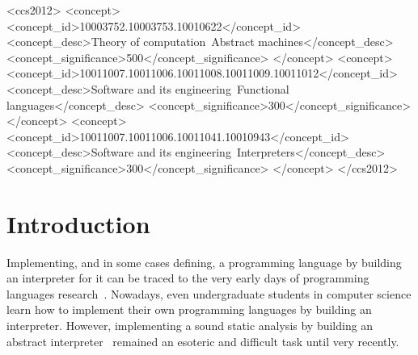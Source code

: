 \documentclass[acmsmall, screen]{acmart}\settopmatter{}
\begin{document}
\begin{CCSXML}
<ccs2012>
<concept>
<concept_id>10003752.10003753.10010622</concept_id>
<concept_desc>Theory of computation~Abstract machines</concept_desc>
<concept_significance>500</concept_significance>
</concept>
<concept>
<concept_id>10011007.10011006.10011008.10011009.10011012</concept_id>
<concept_desc>Software and its engineering~Functional languages</concept_desc>
<concept_significance>300</concept_significance>
</concept>
<concept>
<concept_id>10011007.10011006.10011041.10010943</concept_id>
<concept_desc>Software and its engineering~Interpreters</concept_desc>
<concept_significance>300</concept_significance>
</concept>
</ccs2012>
\end{CCSXML}





\maketitle


\section{Introduction}
\vspace{-0.7ex}

Implementing, and in some cases defining, a programming language by building an
interpreter for it can be traced to the very early days of programming languages
research~\cite{McCarthy:1960:RFS:367177.367199,landin1966next,Reynolds:72}.
Nowadays, even undergraduate students in computer science learn how to implement
their own programming languages by building an interpreter.
However, implementing a sound static analysis by building an
abstract interpreter~\cite{cousot1977abstract} remained an esoteric and difficult
task until very recently.
\end{document}
